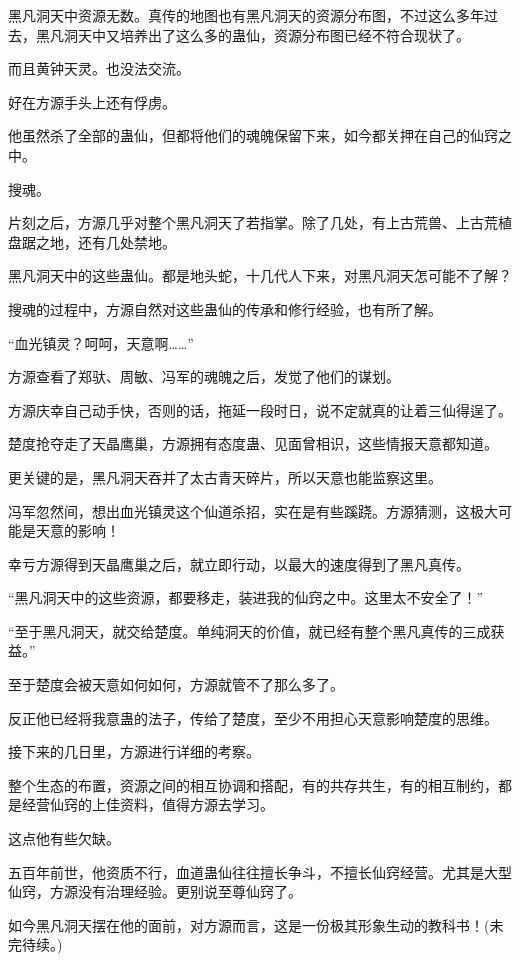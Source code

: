 \begin{this_body}
黑凡洞天中资源无数。真传的地图也有黑凡洞天的资源分布图，不过这么多年过去，黑凡洞天中又培养出了这么多的蛊仙，资源分布图已经不符合现状了。

而且黄钟天灵。也没法交流。

好在方源手头上还有俘虏。

他虽然杀了全部的蛊仙，但都将他们的魂魄保留下来，如今都关押在自己的仙窍之中。

搜魂。

片刻之后，方源几乎对整个黑凡洞天了若指掌。除了几处，有上古荒兽、上古荒植盘踞之地，还有几处禁地。

黑凡洞天中的这些蛊仙。都是地头蛇，十几代人下来，对黑凡洞天怎可能不了解？

搜魂的过程中，方源自然对这些蛊仙的传承和修行经验，也有所了解。

“血光镇灵？呵呵，天意啊……”

方源查看了郑驮、周敏、冯军的魂魄之后，发觉了他们的谋划。

方源庆幸自己动手快，否则的话，拖延一段时日，说不定就真的让着三仙得逞了。

楚度抢夺走了天晶鹰巢，方源拥有态度蛊、见面曾相识，这些情报天意都知道。

更关键的是，黑凡洞天吞并了太古青天碎片，所以天意也能监察这里。

冯军忽然间，想出血光镇灵这个仙道杀招，实在是有些蹊跷。方源猜测，这极大可能是天意的影响！

幸亏方源得到天晶鹰巢之后，就立即行动，以最大的速度得到了黑凡真传。

“黑凡洞天中的这些资源，都要移走，装进我的仙窍之中。这里太不安全了！”

“至于黑凡洞天，就交给楚度。单纯洞天的价值，就已经有整个黑凡真传的三成获益。”

至于楚度会被天意如何如何，方源就管不了那么多了。

反正他已经将我意蛊的法子，传给了楚度，至少不用担心天意影响楚度的思维。

接下来的几日里，方源进行详细的考察。

整个生态的布置，资源之间的相互协调和搭配，有的共存共生，有的相互制约，都是经营仙窍的上佳资料，值得方源去学习。

这点他有些欠缺。

五百年前世，他资质不行，血道蛊仙往往擅长争斗，不擅长仙窍经营。尤其是大型仙窍，方源没有治理经验。更别说至尊仙窍了。

如今黑凡洞天摆在他的面前，对方源而言，这是一份极其形象生动的教科书！(未完待续。)

\end{this_body}

